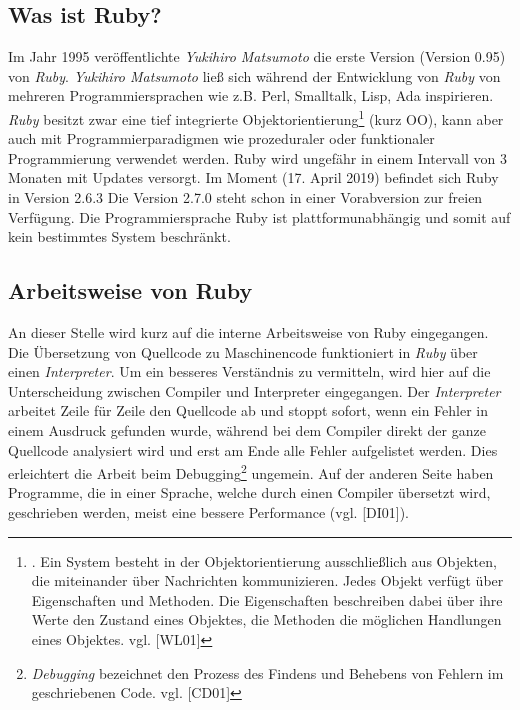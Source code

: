 \documentclass[12pt,DIV=14, version=first, BCOR=10mm,a4paper,twoside,parskip=half-,headsepline,headinclude]{scrartcl}
\begin{document}
\subsection{Was ist Ruby?} \label{Was ist Ruby?}
\begin{flushleft}
Im Jahr 1995 veröffentlichte \textit{Yukihiro Matsumoto} die erste Version (Version 0.95) von \textit{\glqq Ruby\grqq}. \textit{Yukihiro Matsumoto} ließ sich während der Entwicklung von \textit{\glqq Ruby\grqq} von mehreren Programmiersprachen wie z.B. Perl, Smalltalk, Lisp, Ada inspirieren. \textit{Ruby} besitzt zwar eine tief integrierte
Objektorientierung\footnote{\label{foot:1}. Ein System besteht in der Objektorientierung ausschließlich aus Objekten, die miteinander über Nachrichten kommunizieren. Jedes Objekt verfügt über Eigenschaften und Methoden. Die Eigenschaften beschreiben dabei über ihre Werte den Zustand eines Objektes, die Methoden die möglichen Handlungen eines Objektes. vgl. [WL01]} (kurz OO), kann aber auch mit  Programmierparadigmen wie prozeduraler oder funktionaler Programmierung verwendet werden. Ruby wird ungefähr in einem Intervall von 3 Monaten mit Updates versorgt. Im Moment (17. April 2019) befindet sich Ruby in Version 2.6.3 Die Version 2.7.0 steht schon in einer Vorabversion zur freien Verfügung. Die Programmiersprache Ruby ist plattformunabhängig und somit auf kein bestimmtes System beschränkt.
\end{flushleft}

\subsection{Arbeitsweise von Ruby}
\begin{flushleft}
An dieser Stelle wird kurz auf die interne Arbeitsweise von Ruby eingegangen. Die Übersetzung von Quellcode zu Maschinencode funktioniert in \textit{\glqq Ruby\grqq} über einen \textit{Interpreter}. Um ein besseres Verständnis zu vermitteln, wird hier auf die Unterscheidung zwischen Compiler und Interpreter eingegangen. Der \textit{Interpreter} arbeitet Zeile für Zeile den Quellcode ab und stoppt sofort, wenn ein Fehler in einem Ausdruck gefunden wurde, während bei dem Compiler direkt der ganze Quellcode analysiert wird und erst am Ende alle Fehler aufgelistet werden. Dies erleichtert die Arbeit beim Debugging\footnote{\label{foot:2} \textit{Debugging} bezeichnet den Prozess des Findens und Behebens von Fehlern im geschriebenen Code. vgl. [CD01]} ungemein. Auf der anderen Seite haben Programme, die in einer Sprache, welche durch einen Compiler übersetzt wird, geschrieben werden, meist eine bessere Performance (vgl. [DI01]).
\end{flushleft}
\end{document}
